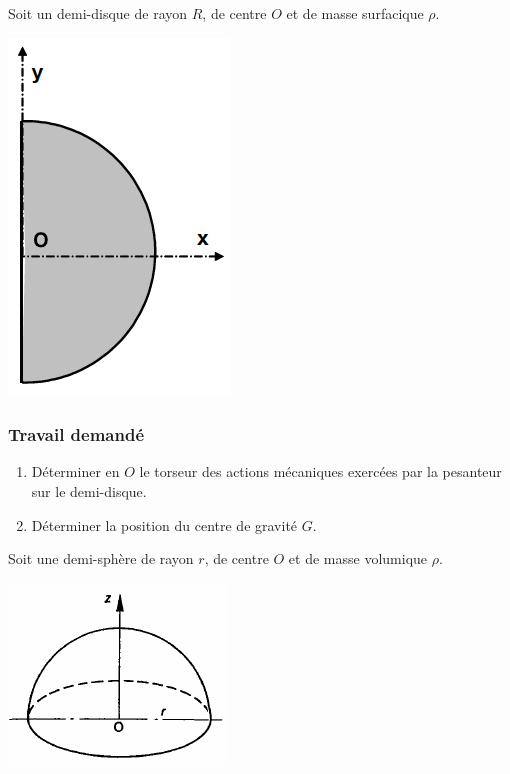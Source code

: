 \newpage


Soit un demi-disque de rayon $R$, de centre $O$ et de masse surfacique $\rho$.

\begin{center}
\includegraphics[scale=0.5]{png/demi-disque.png}
\end{center}

\subsubsection{Travail demandé}
\begin{enumerate}
\item Déterminer en $O$ le torseur des actions mécaniques exercées par la
pesanteur sur le demi-disque.
\item Déterminer la position du centre de gravité $G$.
\end{enumerate}

\newpage


Soit une demi-sphère de rayon $r$, de centre $O$ et de masse volumique $\rho$.

\begin{center}
\includegraphics[scale=0.7]{png/demi-sphere.png}
\end{center}

